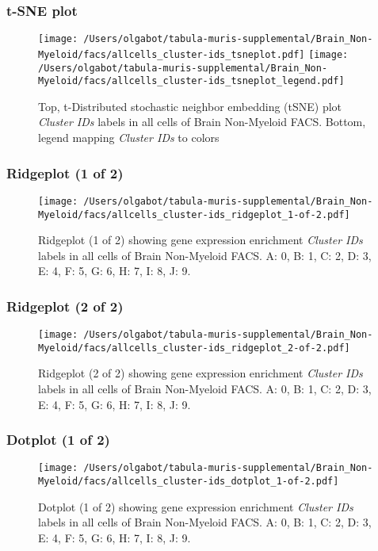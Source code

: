 \clearpage
\subsubsection{t-SNE plot}
\begin{figure}[h]
\centering
\texttt{[image: /Users/olgabot/tabula-muris-supplemental/Brain\_Non-Myeloid/facs/allcells\_cluster-ids\_tsneplot.pdf]}
\texttt{[image: /Users/olgabot/tabula-muris-supplemental/Brain\_Non-Myeloid/facs/allcells\_cluster-ids\_tsneplot\_legend.pdf]}
\caption{Top, t-Distributed stochastic neighbor embedding (tSNE) plot  \emph{Cluster IDs} labels in all cells of Brain Non-Myeloid FACS. Bottom, legend mapping \emph{Cluster IDs} to colors}
\end{figure}


\clearpage

\subsubsection{Ridgeplot (1 of 2)}
\begin{figure}[h]
\centering
\texttt{[image: /Users/olgabot/tabula-muris-supplemental/Brain\_Non-Myeloid/facs/allcells\_cluster-ids\_ridgeplot\_1-of-2.pdf]}

\caption{ Ridgeplot (1 of 2)  showing gene expression enrichment \emph{Cluster IDs} labels in all cells of Brain Non-Myeloid FACS. A: 0, B: 1, C: 2, D: 3, E: 4, F: 5, G: 6, H: 7, I: 8, J: 9.}
\end{figure}


\clearpage

\subsubsection{Ridgeplot (2 of 2)}
\begin{figure}[h]
\centering
\texttt{[image: /Users/olgabot/tabula-muris-supplemental/Brain\_Non-Myeloid/facs/allcells\_cluster-ids\_ridgeplot\_2-of-2.pdf]}

\caption{ Ridgeplot (2 of 2)  showing gene expression enrichment \emph{Cluster IDs} labels in all cells of Brain Non-Myeloid FACS. A: 0, B: 1, C: 2, D: 3, E: 4, F: 5, G: 6, H: 7, I: 8, J: 9.}
\end{figure}


\clearpage

\subsubsection{Dotplot (1 of 2)}
\begin{figure}[h]
\centering
\texttt{[image: /Users/olgabot/tabula-muris-supplemental/Brain\_Non-Myeloid/facs/allcells\_cluster-ids\_dotplot\_1-of-2.pdf]}

\caption{ Dotplot (1 of 2)  showing gene expression enrichment \emph{Cluster IDs} labels in all cells of Brain Non-Myeloid FACS. A: 0, B: 1, C: 2, D: 3, E: 4, F: 5, G: 6, H: 7, I: 8, J: 9.}
\end{figure}


